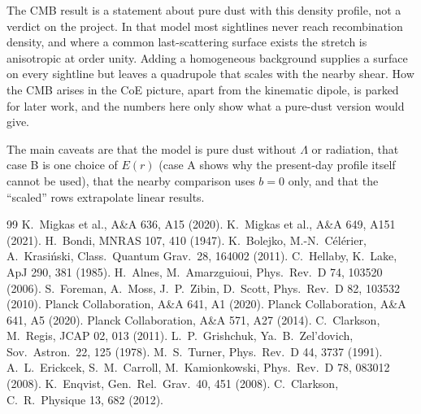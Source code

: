 \documentclass[10pt,twocolumn,letterpaper]{article}
\begin{document}
The CMB result is a statement about pure dust with this density profile, not a verdict on the project. In that model most sightlines never reach recombination density, and where a common last-scattering surface exists the stretch is anisotropic at order unity. Adding a homogeneous background supplies a surface on every sightline but leaves a quadrupole that scales with the nearby shear. How the CMB arises in the CoE picture, apart from the kinematic dipole, is parked for later work, and the numbers here only show what a pure-dust version would give.

The main caveats are that the model is pure dust without $\Lambda$ or radiation, that case B is one choice of $E(r)$ (case A shows why the present-day profile itself cannot be used), that the nearby comparison uses $b=0$ only, and that the ``scaled'' rows extrapolate linear results.

\small
\begin{thebibliography}{99}\setlength{\itemsep}{0pt}
 K.~Migkas et al., A\&A 636, A15 (2020).
 K.~Migkas et al., A\&A 649, A151 (2021).
 H.~Bondi, MNRAS 107, 410 (1947).
 K.~Bolejko, M.-N.~C\'el\'erier, A.~Krasi\'nski, Class.\ Quantum Grav.\ 28, 164002 (2011).
 C.~Hellaby, K.~Lake, ApJ 290, 381 (1985).
 H.~Alnes, M.~Amarzguioui, Phys.\ Rev.\ D 74, 103520 (2006).
 S.~Foreman, A.~Moss, J.~P.~Zibin, D.~Scott, Phys.\ Rev.\ D 82, 103532 (2010).
 Planck Collaboration, A\&A 641, A1 (2020).
 Planck Collaboration, A\&A 641, A5 (2020).
 Planck Collaboration, A\&A 571, A27 (2014).
 C.~Clarkson, M.~Regis, JCAP 02, 013 (2011).
 L.~P.~Grishchuk, Ya.~B.~Zel'dovich, Sov.\ Astron.\ 22, 125 (1978).
 M.~S.~Turner, Phys.\ Rev.\ D 44, 3737 (1991).
 A.~L.~Erickcek, S.~M.~Carroll, M.~Kamionkowski, Phys.\ Rev.\ D 78, 083012 (2008).
 K.~Enqvist, Gen.\ Rel.\ Grav.\ 40, 451 (2008).
 C.~Clarkson, C.\ R.\ Physique 13, 682 (2012).
\end{thebibliography}
\end{document}
